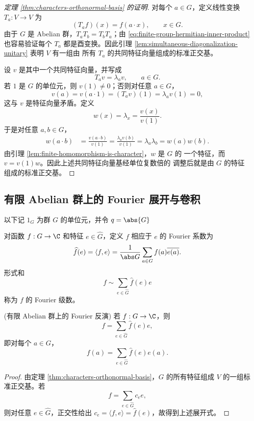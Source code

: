 \begin{proof}[定理 \ref{thm:characters-orthonormal-basis} 的证明]
	对每个 $a\in G$，定义线性变换 $T_a:V\to V$ 为
	\[
	(T_af)(x)=f(a\cdot x),
	\qquad x\in G.
	\]
	由于 $G$ 是 Abelian 群，$T_aT_b=T_bT_a$；由
	\eqref{eq:finite-group-hermitian-inner-product} 也容易验证每个
	$T_a$ 都是酉变换。因此引理
	\ref{lem:simultaneous-diagonalization-unitary} 表明 $V$ 有一组由
	所有 $T_a$ 的共同特征向量组成的标准正交基。

	设 $v$ 是其中一个共同特征向量，并写成
	\[
	T_av=\lambda_av,
	\qquad a\in G.
	\]
	若 $1$ 是 $G$ 的单位元，则 $v(1)\neq0$；否则对任意 $a\in G$，
	\[
	v(a)=v(a\cdot1)=(T_av)(1)=\lambda_av(1)=0,
	\]
	这与 $v$ 是特征向量矛盾。定义
	\[
	w(x)=\lambda_x=\frac{v(x)}{v(1)}.
	\]
	于是对任意 $a,b\in G$，
	\[
	\begin{aligned}
	w(a\cdot b)
	&=\frac{v(a\cdot b)}{v(1)}
	=\frac{\lambda_av(b)}{v(1)}
	=\lambda_a\lambda_b
	=w(a)w(b).
	\end{aligned}
	\]
	由引理 \ref{lem:finite-homomorphism-is-character}，$w$ 是 $G$ 的
	一个特征，而 $v=v(1)w$。因此上述共同特征向量基经单位复数倍的
	调整后就是由 $G$ 的特征组成的标准正交基。
\end{proof}

\subsection*{有限 Abelian 群上的 Fourier 展开与卷积}

以下记 $1_G$ 为群 $G$ 的单位元，并令 $q=\abs{G}$
\begin{definition}
	对函数
$f:G\to\C$ 和特征 $e\in\widehat G$，定义 $f$ 相应于 $e$ 的
Fourier 系数为
\[
\widehat f(e)=\langle f,e\rangle
=\frac1{\abs G}\sum_{a\in G}f(a)\overline{e(a)}.
\]
形式和
\[
f\sim\sum_{e\in\widehat G}\widehat f(e)e
\]
称为 $f$ 的 Fourier 级数。
\end{definition}

\begin{theorem}(有限 Abelian 群上的 Fourier 反演)
	\label{thm:finite-abelian-fourier-inversion}
	若 $f:G\to\C$，则
	\[
	f=\sum_{e\in\widehat G}\widehat f(e)e,
	\]
	即对每个 $a\in G$，
	\[
	f(a)=\sum_{e\in\widehat G}\widehat f(e)e(a).
	\]
\end{theorem}

\begin{proof}
	由定理 \ref{thm:characters-orthonormal-basis}，$G$ 的所有特征组成
	$V$ 的一组标准正交基。若
	\[
	f=\sum_{e\in\widehat G}c_ee,
	\]
	则对任意 $e\in\widehat G$，正交性给出
	$c_e=\langle f,e\rangle=\widehat f(e)$，故得到上述展开式。
\end{proof}

